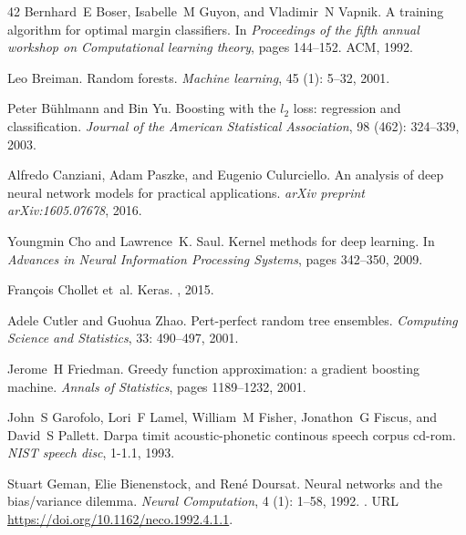 \documentclass[11pt]{article}
\begin{document}
\begin{thebibliography}{42}
Bernhard~E Boser, Isabelle~M Guyon, and Vladimir~N Vapnik.
\newblock A training algorithm for optimal margin classifiers.
\newblock In \emph{Proceedings of the fifth annual workshop on Computational
  learning theory}, pages 144--152. ACM, 1992.

Leo Breiman.
\newblock Random forests.
\newblock \emph{Machine learning}, 45 (1): 5--32, 2001.

Peter B{\"u}hlmann and Bin Yu.
\newblock Boosting with the $l_2$ loss: regression and classification.
\newblock \emph{Journal of the American Statistical Association}, 98
  (462): 324--339, 2003.

Alfredo Canziani, Adam Paszke, and Eugenio Culurciello.
\newblock An analysis of deep neural network models for practical applications.
\newblock \emph{arXiv preprint arXiv:1605.07678}, 2016.

Youngmin Cho and Lawrence~K. Saul.
\newblock Kernel methods for deep learning.
\newblock In \emph{Advances in Neural Information Processing Systems}, pages
  342--350, 2009.

Fran\c{c}ois Chollet et~al.
\newblock Keras.
, 2015.

Adele Cutler and Guohua Zhao.
\newblock Pert-perfect random tree ensembles.
\newblock \emph{Computing Science and Statistics}, 33: 490--497, 2001.

Jerome~H Friedman.
\newblock Greedy function approximation: a gradient boosting machine.
\newblock \emph{Annals of Statistics}, pages 1189--1232, 2001.

John~S Garofolo, Lori~F Lamel, William~M Fisher, Jonathon~G Fiscus, and David~S
  Pallett.
\newblock Darpa timit acoustic-phonetic continous speech corpus cd-rom.
\newblock \emph{NIST speech disc}, 1-1.1, 1993.

Stuart Geman, Elie Bienenstock, and René Doursat.
\newblock Neural networks and the bias/variance dilemma.
\newblock \emph{Neural Computation}, 4 (1): 1--58, 1992.
\newblock {}.
\newblock URL \url{https://doi.org/10.1162/neco.1992.4.1.1}.


\end{thebibliography}
\end{document}
